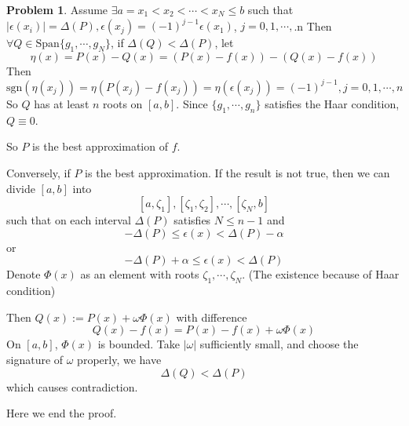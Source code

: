 \documentclass[a4paper]{article}
\theoremstyle{definition}
\newtheorem{problem}{Problem}
\theoremstyle{plain}
\newcommand{\Span}{\mathrm{Span}}
\newcommand{\sgn}{\mathrm{sgn}}
\numberwithin{equation}{problem}
\begin{document}
\begin{problem}
    Assume  $ \exists a=x_1<x_2<\cdots<x_N \leq b $ such that  $ |\epsilon(x_i)|=\Delta(P),\epsilon(x_j)=(-1)^{j-1}\epsilon (x_1) $,  $ j=0,1,\cdots, $.n Then  $ \forall Q\in \Span\{g_1,\cdots,g_N\} $, if  $ \Delta(Q)<\Delta(P) $, 
    let 
    \[\eta(x)=P(x)-Q(x)=(P(x)-f(x))-(Q(x)-f(x))\]
    Then 
    \[\sgn(\eta(x_j))=\eta(P(x_j)-f(x_j))=\eta(\epsilon(x_j))=(-1)^{j-1},j=0,1,\cdots,n\]
    So  $ Q $  has    at least  $ n $ roots on  $ [a,b] $. Since  $ \{g_1,\cdots,g_n\} $ satisfies the Haar condition,  $ Q\equiv 0 $.
    
    So  $ P $ is the best approximation of  $ f $.
    
    Conversely, if  $ P $  is the best approximation. If the result is not true, then we can divide  $ [a,b] $  into 
    \[[a,\zeta_1],[\zeta_1,\zeta_2],\cdots,[\zeta_{N},b]\]
    such that on each interval  $ \Delta(P) $ satisfies  $ N \leq n-1 $ and  
    \[-\Delta(P) \leq \epsilon(x)<\Delta(P)-\alpha\]
    or 
    \[-\Delta(P)+\alpha \leq \epsilon(x)<\Delta(P)\] 
    Denote  $ \Phi(x) $ as an element with roots  $ \zeta_1,\cdots,\zeta_N $. (The existence because of Haar condition)
    
    Then  $ Q(x):=P(x)+\omega \Phi(x) $ with difference 
    \[Q(x)-f(x)=P(x)-f(x)+\omega\Phi(x)\]
    On  $ [a,b] $,  $ \Phi(x) $ is bounded. Take  $ |\omega| $ sufficiently small, and choose the signature of  $ \omega $     properly, we have 
    \[\Delta(Q)<\Delta(P)\]
    which causes contradiction.

    Here we end the proof.
\end{problem}
\end{document}
